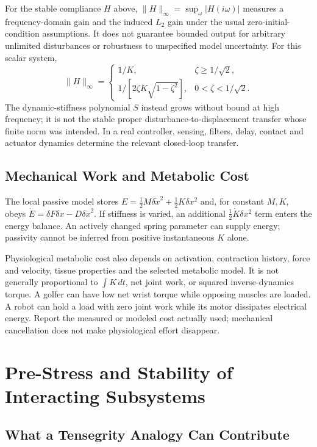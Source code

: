 For the stable compliance $H$ above,
$\|H\|_\infty=\sup_\omega|H(i\omega)|$ measures a frequency-domain gain and
the induced $L_2$ gain under the usual zero-initial-condition assumptions.
It does not guarantee bounded output for arbitrary unlimited disturbances or
robustness to unspecified model uncertainty. For this scalar system,
\begin{equation}
\|H\|_\infty=
\begin{cases}
1/K,&\zeta\geq1/\sqrt2,\\[2pt]
1/[2\zeta K\sqrt{1-\zeta^2}],&0<\zeta<1/\sqrt2.
\end{cases}
\label{eq:ch8:hinfinity}
\end{equation}
The dynamic-stiffness polynomial $S$ instead grows without bound at high
frequency; it is not the stable proper disturbance-to-displacement transfer
whose finite norm was intended. In a real controller, sensing, filters, delay,
contact and actuator dynamics determine the relevant closed-loop transfer.

\subsection{Mechanical Work and Metabolic Cost}

The local passive model stores
$E=\tfrac12M\delta\dot x^2+\tfrac12K\delta x^2$ and, for constant $M,K$,
obeys $\dot E=\delta F\delta\dot x-D\delta\dot x^2$.
If stiffness is varied, an additional $\tfrac12\dot K\delta x^2$ term enters
the energy balance. An actively changed spring parameter can supply energy;
passivity cannot be inferred from positive instantaneous $K$ alone.

Physiological metabolic cost also depends on activation, contraction history,
force and velocity, tissue properties and the selected metabolic model.
It is not generally proportional to $\int K\,dt$, net joint work, or squared
inverse-dynamics torque. A golfer can have low net wrist torque while opposing
muscles are loaded. A robot can hold a load with zero joint work while its
motor dissipates electrical energy. Report the measured or modeled cost actually
used; mechanical cancellation does not make physiological effort disappear.

\section{Pre-Stress and Stability of Interacting Subsystems}

\subsection{What a Tensegrity Analogy Can Contribute}

